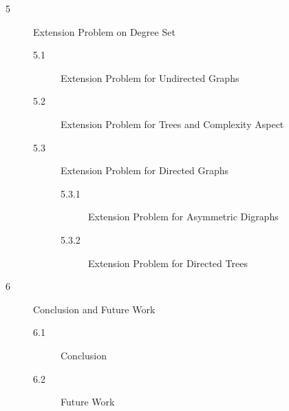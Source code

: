 \begin{description}

 \item[5] Extension Problem on Degree Set
            \begin{description}
               \item[5.1] Extension Problem for Undirected Graphs
               \item[5.2] Extension Problem for Trees and Complexity Aspect
               \item[5.3] Extension Problem for Directed Graphs
                    \begin{description}
                     \item[5.3.1] Extension Problem for Asymmetric Digraphs
                     \item[5.3.2] Extension Problem for Directed Trees
                   \end{description}
             \end{description}


 \item[6] Conclusion and Future Work
            \begin{description}
               \item[6.1] Conclusion
               \item[6.2] Future Work
            \end{description}

\end{description}

